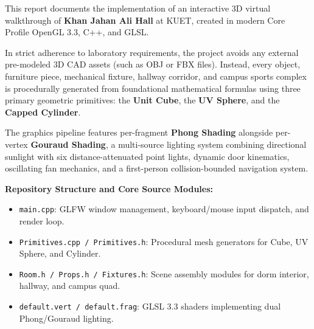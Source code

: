 \documentclass[11pt,a4paper]{article}
\begin{document}
\clearpage

\setcounter{tocdepth}{2}
\vspace*{-0.2cm}
{\normalsize
\tableofcontents
}
\vspace{0.6cm}

\begin{tcolorbox}[colback=boxbg, colframe=kuetblue, arc=3pt, title={\textbf{Executive Summary and Project Scope}}, fonttitle=\bfseries]
This report documents the implementation of an interactive 3D virtual walkthrough of \textbf{Khan Jahan Ali Hall} at KUET, created in modern Core Profile OpenGL 3.3, C++, and GLSL. 

In strict adherence to laboratory requirements, the project avoids any external pre-modeled 3D CAD assets (such as OBJ or FBX files). Instead, every object, furniture piece, mechanical fixture, hallway corridor, and campus sports complex is procedurally generated from foundational mathematical formulas using three primary geometric primitives: the \textbf{Unit Cube}, the \textbf{UV Sphere}, and the \textbf{Capped Cylinder}.

The graphics pipeline features per-fragment \textbf{Phong Shading} alongside per-vertex \textbf{Gouraud Shading}, a multi-source lighting system combining directional sunlight with six distance-attenuated point lights, dynamic door kinematics, oscillating fan mechanics, and a first-person collision-bounded navigation system.
\end{tcolorbox}

\vspace{0.4cm}
\begin{tcolorbox}[colback=lightgraybg, colframe=bordergray, arc=3pt]
\textbf{Repository Structure and Core Source Modules:}
\begin{itemize}[leftmargin=1.2em, itemsep=1pt, topsep=1pt]
    \item \texttt{main.cpp}: GLFW window management, keyboard/mouse input dispatch, and render loop.
    \item \texttt{Primitives.cpp / Primitives.h}: Procedural mesh generators for Cube, UV Sphere, and Cylinder.
    \item \texttt{Room.h / Props.h / Fixtures.h}: Scene assembly modules for dorm interior, hallway, and campus quad.
    \item \texttt{default.vert / default.frag}: GLSL 3.3 shaders implementing dual Phong/Gouraud lighting.
\end{itemize}
\end{tcolorbox}
\end{document}
